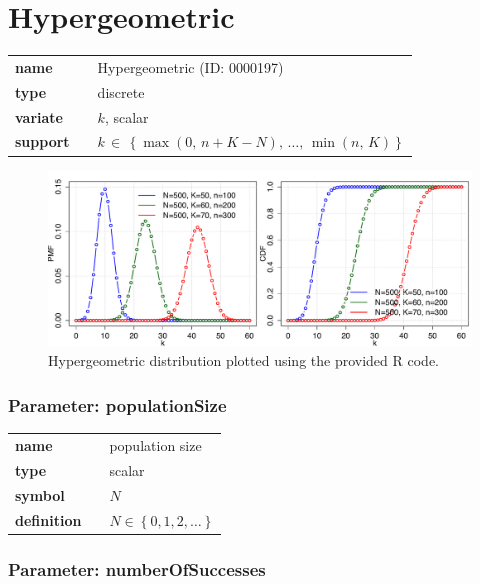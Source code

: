 \section*{Hypergeometric} 

  \bigskip 

\begin{tabular}{p{2cm}cl}
\textbf{name} & & Hypergeometric (ID: 0000197)\\ 
 
\textbf{type} & & discrete \\ 

\textbf{variate} & & $k$, scalar \\ 

\textbf{support} & & $k\, \in\, \left\{\max{(0,\, n+K-N)},\, \dots,\, \min{(n,\, K )}\right\}$
\end{tabular}

\begin{figure}[ht!]
\centering
  \includegraphics[width=140mm]{pics/Hypergeometric.pdf}
 \caption{Hypergeometric distribution plotted using the provided R code.}
 \label{fig:Hypergeometric}
\end{figure}

\subsubsection*{Parameter: populationSize}

\noindent\begin{tabular}{p{2cm}cl}
\textbf{name} & & population size \\
\textbf{type} & & scalar \\
\textbf{symbol} & & $N$  \\
\textbf{definition} & & $N \in \left\{0,1,2,\dots\right\}$
\end{tabular}
\subsubsection*{Parameter: numberOfSuccesses}

